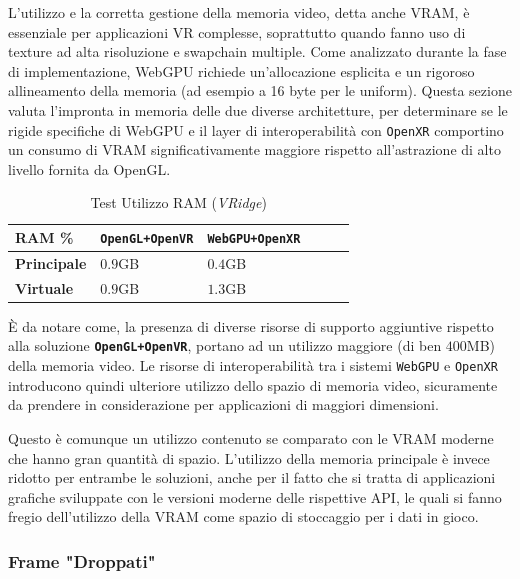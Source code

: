 \documentclass[a4paper, 11pt, twoside]{report}
\begin{document}
L'utilizzo e la corretta gestione della memoria video, detta anche VRAM, è essenziale per applicazioni VR complesse,
soprattutto quando fanno uso di texture ad alta risoluzione e swapchain multiple. Come analizzato durante la fase di
implementazione, WebGPU richiede un'allocazione esplicita e un rigoroso allineamento della memoria (ad esempio a 16 byte
per le uniform).
Questa sezione valuta l'impronta in memoria delle due diverse architetture, per determinare se le rigide specifiche di
WebGPU e il layer di interoperabilità con \texttt{\gls{OpenXR}} comportino un consumo di VRAM significativamente
maggiore rispetto all'astrazione di alto livello fornita da OpenGL.

\begin{table}[h]
\centering
\caption{Test Utilizzo RAM (\textit{VRidge})}
\begin{tabular}{lp{5cm}lp{5cm}lp{5cm}}
\toprule
\textbf{RAM \%} &
\textcolor{blue!40}{\textbf{\texttt{OpenGL+OpenVR}}} &
\textcolor{violet!75}{\textbf{\texttt{WebGPU+OpenXR}}} \\
\midrule
\textbf{Principale} & $0.9$GB & $0.4$GB                \\
\textbf{Virtuale}   & $0.9$GB & $1.3$GB                \\
\bottomrule
\end{tabular}
\end{table}

È da notare come, la presenza di diverse risorse di supporto aggiuntive rispetto alla soluzione
\textcolor{blue!40}{\textbf{\texttt{OpenGL+OpenVR}}}, portano ad un utilizzo maggiore (di ben $400$MB) della memoria
video. Le risorse di interoperabilità tra i sistemi \texttt{WebGPU} e \texttt{\gls{OpenXR}} introducono quindi ulteriore
utilizzo dello spazio di memoria video, sicuramente da prendere in considerazione per applicazioni di maggiori
dimensioni.

Questo è comunque un utilizzo contenuto se comparato con le VRAM moderne che hanno gran quantità di spazio.
L'utilizzo della memoria principale è invece ridotto per entrambe le soluzioni, anche per il fatto che si tratta
di applicazioni grafiche sviluppate con le versioni moderne delle rispettive API, le quali si fanno fregio dell'utilizzo
della VRAM come spazio di stoccaggio per i dati in gioco.

\subsubsection{Frame "Droppati"}
\end{document}
